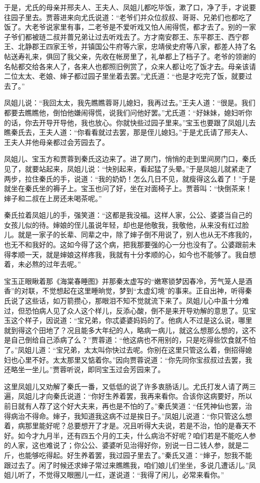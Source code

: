 \documentclass[12pt,oneside]{book}
\begin{document}
于是，尤氏的母亲并邢夫人、王夫人、凤姐儿都吃毕饭，漱了口，净了手，才说要往园子里去。贾蓉进来向尤氏说道：“老爷们并众位叔叔、哥哥、兄弟们也都吃了饭了。大老爷说家里有事，二老爷是不爱听戏又怕人闹得慌，都才去了。别的一家子爷们都被琏二叔并蔷兄弟让过去听戏去了。方才南安郡王、东平郡王、西宁郡王、北静郡王四家王爷，并镇国公牛府等六家，忠靖侯史府等八家，都差人持了名帖送寿礼来，俱回了我父亲，先收在帐房里了，礼单都上了档子了。老爷的领谢的名帖都交给各来人了，各来人也都照旧例赏了，众来人都让吃了饭才去。母亲该请二位太太、老娘、婶子都过园子里坐着去罢。”尤氏道：“也是才吃完了饭，就要过去了。”

凤姐儿说：“我回太太，我先瞧瞧蓉哥儿媳妇，我再过去。”王夫人道：“很是。我们都要去瞧瞧他，倒怕他嫌闹得慌，说我们问他好罢。”尤氏道：“好妹妹，媳妇听你的话，你去开导开导他，我也放心。你就快些过园子里来。”宝玉也要跟了凤姐儿去瞧秦氏去，王夫人道：“你看看就过去罢，那是侄儿媳妇。”于是尤氏请了邢夫人、王夫人并他母亲都过会芳园去了。

凤姐儿、宝玉方和贾蓉到秦氏这边来了。进了房门，悄悄的走到里间房门口，秦氏见了，就要站起来，凤姐儿说：“快别起来，看起猛了头晕。”于是凤姐儿就紧走了两步，拉住秦氏的手，说道：“我的奶奶！怎么几日不见，就瘦得这么着了！”于是就坐在秦氏坐的褥子上。宝玉也问了好，坐在对面椅子上。贾蓉叫：“快倒茶来！婶子和二叔在上房还未喝茶呢。”

秦氏拉着凤姐儿的手，强笑道：“这都是我没福。这样人家，公公、婆婆当自己的女孩儿似的待。婶娘的侄儿虽说年轻，却也是他敬我，我敬他，从来没有红过脸儿。就是一家子的长辈、同辈之中，除了婶子倒不用说了，别人也从无不疼我的，也无不和我好的。这如今得了这个病，把我那要强的心一分也没有了。公婆跟前未得孝顺一天，就是婶娘这样疼我，我就有十分孝顺的心，如今也不能够了。我自想着，未必熬的过年去呢。”

宝玉正眼瞅着那《海棠春睡图》并那秦太虚写的“嫩寒锁梦因春冷，芳气笼人是酒香”的对联，不觉想起在这里睡晌觉，梦到“太虚幻境”的事来。正自出神，听得秦氏说了这些话，如万箭攒心，那眼泪不知不觉就流下来了。凤姐儿心中虽十分难过，但恐怕病人见了众人这个样儿，反添心酸，倒不是来开导劝解的意思了。见宝玉这个样子，因说道：“宝兄弟，你忒婆婆妈妈的了。他病人不过是这么说，哪里就到得这个田地了？况且能多大年纪的人，略病一病儿，就这么想那么想的，这不是自己倒给自己添病了么？”贾蓉道：“他这病也不用别的，只是吃得些饮食就不怕了。”凤姐儿道：“宝兄弟，太太叫你快过去呢。你别在这里只管这么着，倒招得媳妇也心里不好。太太那里又惦着你。”因向贾蓉说道：“你先同你宝叔叔过去罢，我还略坐一坐儿。”贾蓉听说，即同宝玉过会芳园来了。

这里凤姐儿又劝解了秦氏一番，又低低的说了许多衷肠话儿。尤氏打发人请了两三遍，凤姐儿才向秦氏说道：“你好生养着罢，我再来看你。合该你这病要好，所以前日就有人荐了这个好大夫来，再也是不怕的了。”秦氏笑道：“任凭神仙也罢，治得病治不得命。婶子，我知道我这病不过是挨日子。”凤姐儿说道：“你只管这么想着，病那里能好呢？总要想开了才是。况且听得大夫说，若是不治，怕的是春天不好。如今才九月半，还有四五个月的工夫，什么病治不好呢？咱们若是不能吃人参的人家，这也难说了；你公公、婆婆听见治得好你，别说一日二钱人参，就是二斤，也能够吃得起。好生养着罢，我过园子里去了。”秦氏又道：“婶子，恕我不能跟过去了。闲了时候还求婶子常过来瞧瞧我，咱们娘儿们坐坐，多说几遭话儿。”凤姐儿听了，不觉得又眼圈儿一红，遂说道：“我得了闲儿，必常来看你。”
\end{document}
